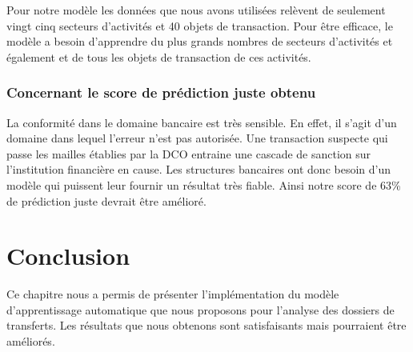 Pour notre modèle les données que nous avons utilisées relèvent de seulement vingt
cinq secteurs d'activités et 40 objets de transaction. Pour être efficace, le
modèle a besoin d'apprendre du plus grands nombres de secteurs d'activités et
également et de tous les objets de transaction de ces activités.


\subsubsection{Concernant le score de prédiction juste obtenu}

La conformité dans le domaine bancaire est très sensible. En effet, il s'agit
d'un domaine dans lequel l'erreur n'est pas autorisée. Une transaction
suspecte qui passe les mailles établies par la DCO entraine une cascade de sanction sur
l'institution financière en cause. Les structures bancaires ont donc besoin d'un
modèle qui puissent leur fournir un résultat très fiable. Ainsi notre score de
63\% de prédiction juste devrait être amélioré.

\section*{Conclusion}
Ce chapitre nous a permis de présenter l'implémentation du modèle
d'apprentissage automatique que nous proposons pour l'analyse des dossiers de
transferts. Les résultats que nous obtenons sont satisfaisants mais pourraient
être améliorés.
